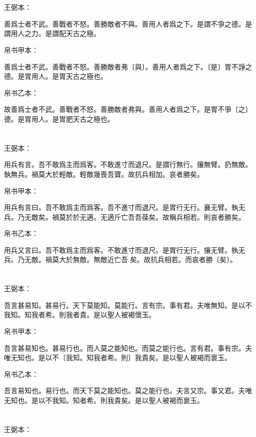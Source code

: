 \documentclass[a5paper]{ctexbook}
\begin{document}
    \chapter{}
    王弼本：

    善爲士者不武。善戰者不怒。善勝敵者不與。善用人者爲之下。是謂不爭之德。是謂用人之力。是謂配天古之極。

    
    帛书甲本：

    善爲士者不武。善戰者不怒。善勝敵者弗〔與〕。善用人者爲之下。〔是〕胃不諍之德。是胃用人。是胃天古之極也。

    帛书乙本：

    故善爲士者不武。善戰者不怒。善勝敵者弗與。善用人者爲之下。是胃不爭〔之〕德。是胃用人。是胃肥天古之極也。

    \chapter{}
    王弼本：

    用兵有言。吾不敢爲主而爲客。不敢進寸而退尺。是謂行無行。攘無臂。扔無敵。執無兵。禍莫大於輕敵。輕敵幾喪吾寶。故抗兵相加。哀者勝矣。

    
    帛书甲本：

    用兵有言曰。吾不敢爲主而爲客。吾不進寸而退尺。是胃行无行。襄无臂。執无兵。乃无敵矣。禍莫於於无適。无適斤亡吾吾葆矣。故稱兵相若。則哀者勝矣。

    帛书乙本：

    用兵又言曰。吾不敢爲主而爲客。不敢進寸而退尺。是胃行无行。攘无臂。執无兵。乃无敵。禍莫大於無敵。無敵近亡吾𤥯矣。故抗兵相若。而哀者勝〔矣〕。

    \chapter{}
    王弼本：

    吾言甚易知。甚易行。天下莫能知。莫能行。言有宗。事有君。夫唯無知。是以不我知。知我者希。則我者貴。是以聖人被褐懷玉。

    
    帛书甲本：

    吾言甚易知也。甚易行也。而人莫之能知也。而莫之能行也。言有君。事有宗。夫唯无知也。是以不〔我知。知我者希。則〕我貴矣。是以聖人被褐而褱玉。

    帛书乙本：

    吾言易知也。易行也。而天下莫之能知也。莫之能行也。夫言又宗。事又君。夫唯无知也。是以不我知。知者希。則我貴矣。是以聖人被褐而褱玉。

    \chapter{}
    王弼本：
\end{document}
